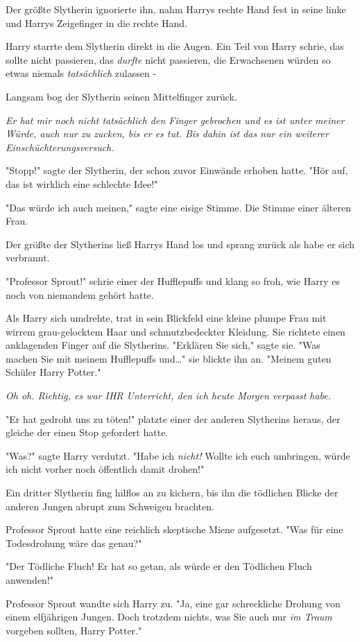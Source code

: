 {Der größte Slytherin ignorierte ihn, nahm Harrys rechte Hand fest in seine linke und Harrys Zeigefinger in die rechte Hand.

Harry starrte dem Slytherin direkt in die Augen. Ein Teil von Harry schrie, das sollte nicht passieren, das \emph{durfte} nicht passieren, die Erwachsenen würden so etwas niemals \emph{tatsächlich} zulassen -

Langsam bog der Slytherin seinen Mittelfinger zurück.

\emph{Er hat mir noch nicht tatsächlich den Finger gebrochen und es ist unter meiner Würde, auch nur zu zucken, bis er es tut. Bis dahin ist das nur ein weiterer Einschüchterungsversuch.}

"Stopp!" sagte der Slytherin, der schon zuvor Einwände erhoben hatte. "Hör auf, das ist wirklich eine schlechte Idee!"

"Das würde ich auch meinen," sagte eine eisige Stimme. Die Stimme einer älteren Frau.

Der größte der Slytherins ließ Harrys Hand los und sprang zurück als habe er sich verbrannt.

"Professor Sprout!" schrie einer der Hufflepuffs und klang so froh, wie Harry es noch von niemandem gehört hatte.

Als Harry sich umdrehte, trat in sein Blickfeld eine kleine plumpe Frau mit wirrem grau-gelocktem Haar und schmutzbedeckter Kleidung. Sie richtete einen anklagenden Finger auf die Slytherins. "Erklären Sie sich," sagte sie. "Was machen Sie mit meinem Hufflepuffs und…" sie blickte ihn an. "Meinem guten Schüler Harry Potter."

\emph{Oh oh. Richtig, es war IHR Unterricht, den ich heute Morgen verpasst habe.}

"Er hat gedroht uns zu töten!" platzte einer der anderen Slytherins heraus, der gleiche der einen Stop gefordert hatte.

"Was?" sagte Harry verdutzt. "Habe ich \emph{nicht!} Wollte ich euch umbringen, würde ich nicht vorher noch öffentlich damit drohen!"

Ein dritter Slytherin fing hilflos an zu kichern, bis ihn die tödlichen Blicke der anderen Jungen abrupt zum Schweigen brachten.

Professor Sprout hatte eine reichlich skeptische Miene aufgesetzt. "Was für eine Todesdrohung wäre das genau?"

"Der Tödliche Fluch! Er hat so getan, als würde er den Tödlichen Fluch anwenden!"

Professor Sprout wandte sich Harry zu. "Ja, eine gar schreckliche Drohung von einem elfjährigen Jungen. Doch trotzdem nichts, was Sie auch nur \emph{im Traum} vorgeben sollten, Harry Potter."

}
